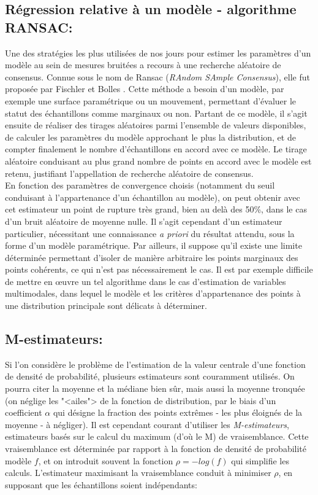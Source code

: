 \subsection{Régression relative à un modèle - algorithme RANSAC:}
Une des stratégies les plus utilisées de nos jours pour estimer les paramètres d'un modèle au sein de mesures bruitées a recours à une recherche aléatoire de consensus. Connue sous le nom de Ransac (\emph{RAndom SAmple Consensus}), elle fut proposée par Fischler et Bolles \cite{Fischler1981}. Cette méthode a besoin d'un modèle, par exemple une surface paramétrique ou un mouvement, permettant d'évaluer le statut des échantillons comme marginaux ou non. Partant de ce modèle, il s'agit ensuite de réaliser des tirages aléatoires parmi l'ensemble de valeurs disponibles, de calculer les paramètres du modèle approchant le plus la distribution, et de compter finalement le nombre d'échantillons en accord avec ce modèle. Le tirage aléatoire conduisant au plus grand nombre de points en accord avec le modèle est retenu, justifiant l'appellation de recherche aléatoire de consensus.\\

En fonction des paramètres de convergence choisis (notamment du seuil conduisant à l'appartenance d'un échantillon au modèle), on peut obtenir avec cet estimateur un point de rupture très grand, bien au delà des 50\%, dans le cas d'un bruit aléatoire de moyenne nulle. Il s'agit cependant d'un estimateur particulier, nécessitant une connaissance \emph{a priori} du résultat attendu, sous la forme d'un modèle paramétrique. Par ailleurs, il suppose qu'il existe une limite déterminée permettant d'isoler de manière arbitraire les points marginaux des points cohérents, ce qui n'est pas nécessairement le cas. Il est par exemple difficile de mettre en œuvre un tel algorithme dans le cas d'estimation de variables multimodales, dans lequel le modèle et les critères d'appartenance des points à une distribution principale sont délicats à déterminer.

\subsection{M-estimateurs:}
Si l'on considère le problème de l'estimation de la valeur centrale d'une fonction de densité de probabilité, plusieurs estimateurs sont couramment utilisés. On pourra citer la moyenne et la médiane bien sûr, mais aussi la moyenne tronquée (on néglige les "<ailes"> de la fonction de distribution, par le biais d'un coefficient $\alpha$ qui désigne la fraction des points extrêmes - les plus éloignés de la moyenne - à négliger). Il est cependant courant d'utiliser les \textit{M-estimateurs}, estimateurs basés sur le calcul du maximum (d'où le M) de vraisemblance. Cette vraisemblance est déterminée par rapport à la fonction de densité de probabilité modèle $f$, et on introduit souvent la fonction $\rho = -log(f)$ qui simplifie les calculs. L'estimateur maximisant la vraisemblance conduit à minimiser $\rho$, en supposant que les échantillons soient indépendants:


